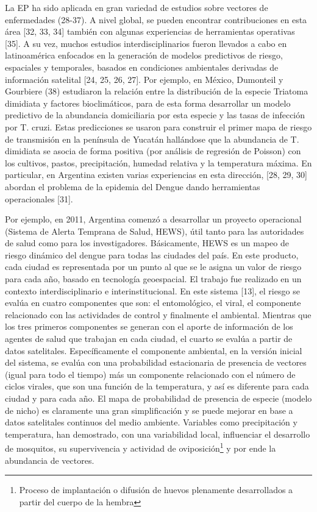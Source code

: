 \par La EP ha sido aplicada en gran variedad de estudios sobre vectores de
  enfermedades (28-37). A nivel global, se pueden encontrar contribuciones en esta área
  [32, 33, 34] también con algunas experiencias de herramientas operativas [35].
  A su vez, muchos estudios interdisciplinarios fueron llevados a cabo en
  latinoamérica enfocados en la generación de modelos predictivos de riesgo,
  espaciales y temporales, basados en condiciones ambientales derivadas de
  información satelital [24, 25, 26, 27].
  Por ejemplo, en México, Dumonteil y Gourbiere (38)
  estudiaron la relación entre la distribución de la especie Triatoma dimidiata
  y factores bioclimáticos, para de esta forma desarrollar un modelo predictivo de
  la abundancia domiciliaria por esta especie y las tasas de infección
  por T. cruzi. Estas predicciones se usaron para construir el primer mapa de
  riesgo de transmisión en la península de Yucatán hallándose que la abundancia de T.
  dimidiata se asocia de forma positiva (por análisis de regresión de Poisson)
  con los cultivos, pastos, precipitación, humedad relativa y la temperatura
  máxima. En particular, en Argentina existen varias experiencias en esta
  dirección, [28, 29, 30] abordan el problema de la epidemia del Dengue dando
  herramientas operacionales [31].

\par Por ejemplo, en 2011, Argentina comenzó a desarrollar un proyecto operacional
  (Sistema de Alerta Temprana de Salud, HEWS), útil tanto para las autoridades de
  salud como para los investigadores.
  Básicamente, HEWS es un mapeo de riesgo dinámico del dengue para todas las
  ciudades del país. En este producto, cada ciudad es representada por un punto
  al que se le asigna un valor de riesgo para cada año, basado en tecnología
  geoespacial. El trabajo fue realizado en un contexto interdisciplinario e
  interinstitucional. En este sistema [13], el riesgo se evalúa en cuatro componentes que son: el
  entomológico, el viral, el componente relacionado con las actividades de
  control y finalmente el ambiental. Mientras que los tres primeros componentes
  se generan con el aporte de información de los agentes de salud que trabajan en cada
  ciudad, el cuarto se evalúa a partir de datos satelitales.
  Específicamente el componente ambiental, en la versión inicial del sistema, se
  evalúa con una probabilidad estacionaria de presencia de vectores (igual para
  todo el tiempo) más un componente relacionado con el número de ciclos virales,
  que son una función de la temperatura, y así es diferente para cada ciudad y
  para cada año. El mapa de probabilidad de presencia de especie (modelo de nicho)
  es claramente una gran simplificación y se puede mejorar en base a datos
  satelitales continuos del medio ambiente. Variables como precipitación y
  temperatura, han demostrado, con una variabilidad local, influenciar el
  desarrollo de mosquitos, su supervivencia y actividad de
  oviposición\footnote{Proceso de implantación o difusión de huevos plenamente
  desarrollados a partir del cuerpo de la hembra} y por ende la abundancia de vectores.

